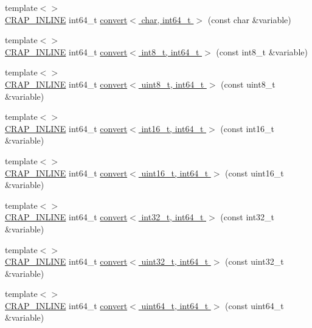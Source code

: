\begin{DoxyCompactItemize}
\item 
{\footnotesize template$<$$>$ }\\\hyperlink{config__x86_8h_a5a40526b8d842e7ff731509998bb0f1c}{C\+R\+A\+P\+\_\+\+I\+N\+L\+I\+N\+E} int64\+\_\+t \hyperlink{namespacecrap_afbde06f2531b3d87f267757ea0ff5ba6}{convert$<$ char, int64\+\_\+t $>$} (const char \&variable)
\item 
{\footnotesize template$<$$>$ }\\\hyperlink{config__x86_8h_a5a40526b8d842e7ff731509998bb0f1c}{C\+R\+A\+P\+\_\+\+I\+N\+L\+I\+N\+E} int64\+\_\+t \hyperlink{namespacecrap_abdb77b47aa38870c7fce4348dbb76a57}{convert$<$ int8\+\_\+t, int64\+\_\+t $>$} (const int8\+\_\+t \&variable)
\item 
{\footnotesize template$<$$>$ }\\\hyperlink{config__x86_8h_a5a40526b8d842e7ff731509998bb0f1c}{C\+R\+A\+P\+\_\+\+I\+N\+L\+I\+N\+E} int64\+\_\+t \hyperlink{namespacecrap_aac52dc6b36db97bd31369f7dc93010dc}{convert$<$ uint8\+\_\+t, int64\+\_\+t $>$} (const uint8\+\_\+t \&variable)
\item 
{\footnotesize template$<$$>$ }\\\hyperlink{config__x86_8h_a5a40526b8d842e7ff731509998bb0f1c}{C\+R\+A\+P\+\_\+\+I\+N\+L\+I\+N\+E} int64\+\_\+t \hyperlink{namespacecrap_af7ccd568188e7b5ee1164ea95909ac05}{convert$<$ int16\+\_\+t, int64\+\_\+t $>$} (const int16\+\_\+t \&variable)
\item 
{\footnotesize template$<$$>$ }\\\hyperlink{config__x86_8h_a5a40526b8d842e7ff731509998bb0f1c}{C\+R\+A\+P\+\_\+\+I\+N\+L\+I\+N\+E} int64\+\_\+t \hyperlink{namespacecrap_abd610895fae7923806a965f88dc4a333}{convert$<$ uint16\+\_\+t, int64\+\_\+t $>$} (const uint16\+\_\+t \&variable)
\item 
{\footnotesize template$<$$>$ }\\\hyperlink{config__x86_8h_a5a40526b8d842e7ff731509998bb0f1c}{C\+R\+A\+P\+\_\+\+I\+N\+L\+I\+N\+E} int64\+\_\+t \hyperlink{namespacecrap_a81b4c11d3612bd0b0c5ad198a19cc7e0}{convert$<$ int32\+\_\+t, int64\+\_\+t $>$} (const int32\+\_\+t \&variable)
\item 
{\footnotesize template$<$$>$ }\\\hyperlink{config__x86_8h_a5a40526b8d842e7ff731509998bb0f1c}{C\+R\+A\+P\+\_\+\+I\+N\+L\+I\+N\+E} int64\+\_\+t \hyperlink{namespacecrap_a885bb705d208a4a942f7f24ff683bc29}{convert$<$ uint32\+\_\+t, int64\+\_\+t $>$} (const uint32\+\_\+t \&variable)
\item 
{\footnotesize template$<$$>$ }\\\hyperlink{config__x86_8h_a5a40526b8d842e7ff731509998bb0f1c}{C\+R\+A\+P\+\_\+\+I\+N\+L\+I\+N\+E} int64\+\_\+t \hyperlink{namespacecrap_aebbb93efdc4b9b84912b1e9d28900597}{convert$<$ uint64\+\_\+t, int64\+\_\+t $>$} (const uint64\+\_\+t \&variable)

\end{DoxyCompactItemize}
